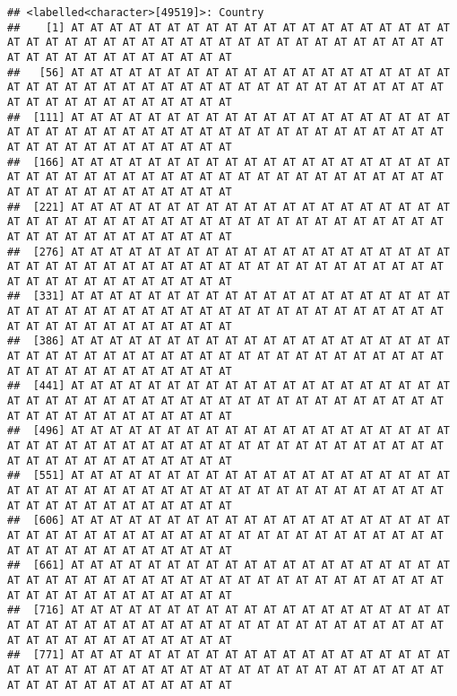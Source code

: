 \documentclass[
]{book}
\begin{document}
\begin{verbatim}
## <labelled<character>[49519]>: Country
##    [1] AT AT AT AT AT AT AT AT AT AT AT AT AT AT AT AT AT AT AT AT AT AT AT AT AT AT AT AT AT AT AT AT AT AT AT AT AT AT AT AT AT AT AT AT AT AT AT AT AT AT AT AT AT AT AT
##   [56] AT AT AT AT AT AT AT AT AT AT AT AT AT AT AT AT AT AT AT AT AT AT AT AT AT AT AT AT AT AT AT AT AT AT AT AT AT AT AT AT AT AT AT AT AT AT AT AT AT AT AT AT AT AT AT
##  [111] AT AT AT AT AT AT AT AT AT AT AT AT AT AT AT AT AT AT AT AT AT AT AT AT AT AT AT AT AT AT AT AT AT AT AT AT AT AT AT AT AT AT AT AT AT AT AT AT AT AT AT AT AT AT AT
##  [166] AT AT AT AT AT AT AT AT AT AT AT AT AT AT AT AT AT AT AT AT AT AT AT AT AT AT AT AT AT AT AT AT AT AT AT AT AT AT AT AT AT AT AT AT AT AT AT AT AT AT AT AT AT AT AT
##  [221] AT AT AT AT AT AT AT AT AT AT AT AT AT AT AT AT AT AT AT AT AT AT AT AT AT AT AT AT AT AT AT AT AT AT AT AT AT AT AT AT AT AT AT AT AT AT AT AT AT AT AT AT AT AT AT
##  [276] AT AT AT AT AT AT AT AT AT AT AT AT AT AT AT AT AT AT AT AT AT AT AT AT AT AT AT AT AT AT AT AT AT AT AT AT AT AT AT AT AT AT AT AT AT AT AT AT AT AT AT AT AT AT AT
##  [331] AT AT AT AT AT AT AT AT AT AT AT AT AT AT AT AT AT AT AT AT AT AT AT AT AT AT AT AT AT AT AT AT AT AT AT AT AT AT AT AT AT AT AT AT AT AT AT AT AT AT AT AT AT AT AT
##  [386] AT AT AT AT AT AT AT AT AT AT AT AT AT AT AT AT AT AT AT AT AT AT AT AT AT AT AT AT AT AT AT AT AT AT AT AT AT AT AT AT AT AT AT AT AT AT AT AT AT AT AT AT AT AT AT
##  [441] AT AT AT AT AT AT AT AT AT AT AT AT AT AT AT AT AT AT AT AT AT AT AT AT AT AT AT AT AT AT AT AT AT AT AT AT AT AT AT AT AT AT AT AT AT AT AT AT AT AT AT AT AT AT AT
##  [496] AT AT AT AT AT AT AT AT AT AT AT AT AT AT AT AT AT AT AT AT AT AT AT AT AT AT AT AT AT AT AT AT AT AT AT AT AT AT AT AT AT AT AT AT AT AT AT AT AT AT AT AT AT AT AT
##  [551] AT AT AT AT AT AT AT AT AT AT AT AT AT AT AT AT AT AT AT AT AT AT AT AT AT AT AT AT AT AT AT AT AT AT AT AT AT AT AT AT AT AT AT AT AT AT AT AT AT AT AT AT AT AT AT
##  [606] AT AT AT AT AT AT AT AT AT AT AT AT AT AT AT AT AT AT AT AT AT AT AT AT AT AT AT AT AT AT AT AT AT AT AT AT AT AT AT AT AT AT AT AT AT AT AT AT AT AT AT AT AT AT AT
##  [661] AT AT AT AT AT AT AT AT AT AT AT AT AT AT AT AT AT AT AT AT AT AT AT AT AT AT AT AT AT AT AT AT AT AT AT AT AT AT AT AT AT AT AT AT AT AT AT AT AT AT AT AT AT AT AT
##  [716] AT AT AT AT AT AT AT AT AT AT AT AT AT AT AT AT AT AT AT AT AT AT AT AT AT AT AT AT AT AT AT AT AT AT AT AT AT AT AT AT AT AT AT AT AT AT AT AT AT AT AT AT AT AT AT
##  [771] AT AT AT AT AT AT AT AT AT AT AT AT AT AT AT AT AT AT AT AT AT AT AT AT AT AT AT AT AT AT AT AT AT AT AT AT AT AT AT AT AT AT AT AT AT AT AT AT AT AT AT AT AT AT AT

\end{verbatim}
\end{document}
